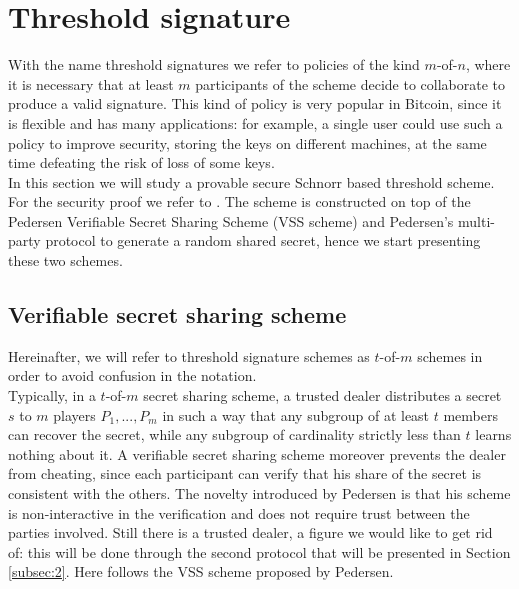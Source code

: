 \bigskip

\bigskip

\section{Threshold signature}
\label{threshold}
With the name threshold signatures we refer to policies of the kind $m$-of-$n$, where it is necessary that at least $m$ participants of the scheme decide to collaborate to produce a valid signature. This kind of policy is very popular in Bitcoin, since it is flexible and has many applications: for example, a single user could use such a policy to improve security, storing the keys on different machines, at the same time defeating the risk of loss of some keys. 
\\
In this section we will study a provable secure Schnorr based threshold scheme. For the security proof we refer to \cite{RefWork:14}. The scheme is constructed on top of the Pedersen Verifiable Secret Sharing Scheme (VSS scheme) and Pedersen's multi-party protocol to generate a random shared secret, hence we start presenting these two schemes.

\bigskip

\subsection{Verifiable secret sharing scheme}
\label{subsec:1}
Hereinafter, we will refer to threshold signature schemes as $t$-of-$m$ schemes in order to avoid confusion in the notation.
\\
Typically, in a $t$-of-$m$ secret sharing scheme, a trusted dealer distributes a secret $s$ to $m$ players $P_1, ..., P_m$ in such a way that any subgroup of at least $t$ members can recover the secret, while any subgroup of cardinality strictly less than $t$ learns nothing about it. A verifiable secret sharing scheme moreover prevents the dealer from cheating, since each participant can verify that his share of the secret is consistent with the others. The novelty introduced by Pedersen is that his scheme is non-interactive in the verification and does not require trust between the parties involved. Still there is a trusted dealer, a figure we would like to get rid of: this will be done through the second protocol that will be presented in Section \ref{subsec:2}. Here follows the VSS scheme proposed by Pedersen.

